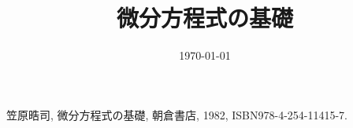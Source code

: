 \documentclass[11pt,a4paper]{jsarticle}
\title{微分方程式の基礎}
\author{}
\date{\today}
\theoremstyle{mystyle}
\begin{document}
%
%

\maketitle

%

\begin{thebibliography}{9}
	 笠原晧司, 微分方程式の基礎, 朝倉書店, 1982, ISBN978-4-254-11415-7.
\end{thebibliography}
%
%
\newpage
\printindex
%
%
\end{document}

